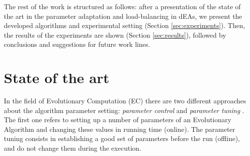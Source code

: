 \documentclass[final,1p,times]{elsarticle}
\begin{document}
The rest of the work is structured as follows: after a presentation of
the state of
the art in the parameter adaptation and load-balancing in dEAs, %
 we present the developed algorithms and experimental setting (Section \ref{sec:experiments}). 
Then, the results of the experiments are shown (Section \ref{sec:results}), followed by conclusions and suggestions for future work lines.


%
\section{State of the art}
\label{sec:soa}


In the field of  Evolutionary Computation (EC) there are two different approaches about the algorithm parameter setting: {\em parameter control} and {\em parameter tuning} \cite{PARAMETERTUNING}. The first one refers to setting up a number of parameters of an Evolutionary Algorithm  and changing these values in running time (online). The parameter tuning consists in establishing a good set of parameters before the run (offline), and do not change them during the execution.
\end{document}
